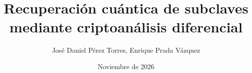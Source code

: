 \documentclass[11pt,a4paper,spanish]{book}
\title{Recuperación cuántica de subclaves mediante criptoanálisis diferencial}
\author{José Daniel Pérez Torres, Enrique Prada Vázquez}
\date{Noviembre de 2026}
\begin{document}
\renewcommand{\listfigurename}{Índice de figuras}
\renewcommand{\listtablename}{Índice de tablas}
\renewcommand{\contentsname}{Índice de contenidos}
\renewcommand{\figurename}{Figura}
\renewcommand{\tablename}{Tabla}

\maketitle

\frontmatter

\tableofcontents


\listoftables

% 
% 

\mainmatter






% 
% 



% 
\end{document}
